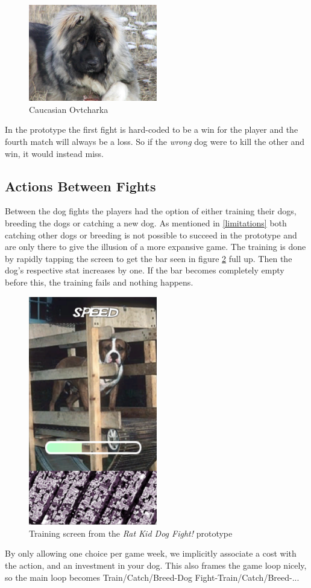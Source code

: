 \begin{figure}
	\centering
    \includegraphics[width=0.5\textwidth]{ovtcharka.jpg}
    \caption{Caucasian Ovtcharka}
    \label{fig:ovtcharka}
\end{figure}

In the prototype the first fight is hard-coded to be a win for the player and the fourth match will always be a loss. So if the \textit{wrong} dog were to kill the other and win, it would instead miss.\

\subsection{Actions Between Fights}
Between the dog fights the players had the option of either training their dogs, breeding the dogs or catching a new dog. As mentioned in \ref{limitations} both catching other dogs or breeding is not possible to succeed in the prototype and are only there to give the illusion of a more expansive game. The training is done by rapidly tapping the screen to get the bar seen in figure \ref{fig:training} full up. Then the dog's respective stat increases by one. If the bar becomes completely empty before this, the training fails and nothing happens.\ 


\begin{figure}[h!] 
	\centering
    \includegraphics[width=0.5\textwidth]{Training.png}
    \caption{Training screen from the \textit{Rat Kid Dog Fight!} prototype}
    \label{fig:training}
\end{figure}

By only allowing one choice per game week, we implicitly associate a cost with the action, and an investment in your dog. This also frames the game loop nicely, so the main loop becomes Train/Catch/Breed-\>Dog Fight-\>Train/Catch/Breed-\>... \